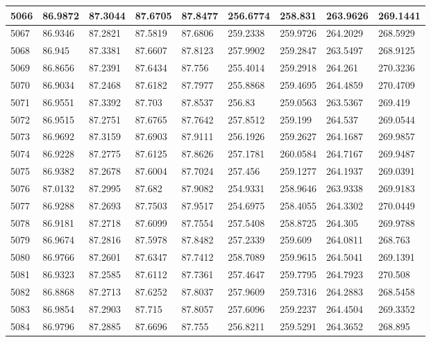 \documentclass[a4paper,11pt]{article}
\begin{document}
\begin{tabularx}{\textwidth}{|l|X|X|X|X|X|X|X|X|}
5066 & 86.9872 & 87.3044 & 87.6705 & 87.8477 & 256.6774 & 258.831 & 263.9626 & 269.1441 \\ \hline
5067 & 86.9346 & 87.2821 & 87.5819 & 87.6806 & 259.2338 & 259.9726 & 264.2029 & 268.5929 \\ \hline
5068 & 86.945 & 87.3381 & 87.6607 & 87.8123 & 257.9902 & 259.2847 & 263.5497 & 268.9125 \\ \hline
5069 & 86.8656 & 87.2391 & 87.6434 & 87.756 & 255.4014 & 259.2918 & 264.261 & 270.3236 \\ \hline
5070 & 86.9034 & 87.2468 & 87.6182 & 87.7977 & 255.8868 & 259.4695 & 264.4859 & 270.4709 \\ \hline
5071 & 86.9551 & 87.3392 & 87.703 & 87.8537 & 256.83 & 259.0563 & 263.5367 & 269.419 \\ \hline
5072 & 86.9515 & 87.2751 & 87.6765 & 87.7642 & 257.8512 & 259.199 & 264.537 & 269.0544 \\ \hline
5073 & 86.9692 & 87.3159 & 87.6903 & 87.9111 & 256.1926 & 259.2627 & 264.1687 & 269.9857 \\ \hline
5074 & 86.9228 & 87.2775 & 87.6125 & 87.8626 & 257.1781 & 260.0584 & 264.7167 & 269.9487 \\ \hline
5075 & 86.9382 & 87.2678 & 87.6004 & 87.7024 & 257.456 & 259.1277 & 264.1937 & 269.0391 \\ \hline
5076 & 87.0132 & 87.2995 & 87.682 & 87.9082 & 254.9331 & 258.9646 & 263.9338 & 269.9183 \\ \hline
5077 & 86.9288 & 87.2693 & 87.7503 & 87.9517 & 254.6975 & 258.4055 & 264.3302 & 270.0449 \\ \hline
5078 & 86.9181 & 87.2718 & 87.6099 & 87.7554 & 257.5408 & 258.8725 & 264.305 & 269.9788 \\ \hline
5079 & 86.9674 & 87.2816 & 87.5978 & 87.8482 & 257.2339 & 259.609 & 264.0811 & 268.763 \\ \hline
5080 & 86.9766 & 87.2601 & 87.6347 & 87.7412 & 258.7089 & 259.9615 & 264.5041 & 269.1391 \\ \hline
5081 & 86.9323 & 87.2585 & 87.6112 & 87.7361 & 257.4647 & 259.7795 & 264.7923 & 270.508 \\ \hline
5082 & 86.8868 & 87.2713 & 87.6252 & 87.8037 & 257.9609 & 259.7316 & 264.2883 & 268.5458 \\ \hline
5083 & 86.9854 & 87.2903 & 87.715 & 87.8057 & 257.6096 & 259.2237 & 264.4504 & 269.3352 \\ \hline
5084 & 86.9796 & 87.2885 & 87.6696 & 87.755 & 256.8211 & 259.5291 & 264.3652 & 268.895 \\ \hline

\end{tabularx}
\end{document}
